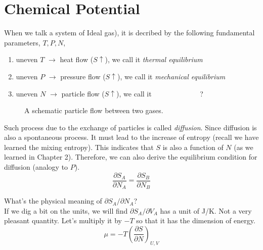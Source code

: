

\section{Chemical Potential}
When we talk a system of Ideal gas), it is decribed by the following fundamental parameters, $T,P,N$,
\begin{enumerate}
\item uneven $T$ $\rightarrow$ heat     flow ($S \uparrow$), we call it {\it thermal equilibrium}
\item uneven $P$ $\rightarrow$ pressure flow ($S \uparrow$), we call it {\it mechanical equilibrium}
\item uneven $N$ $\rightarrow$ particle flow ($S \uparrow$), we call it ~~~~~~~~~~~~~?
\end{enumerate}
\begin{figure}[h]
\centering
{}
\caption{A schematic particle flow between two gases.}
\end{figure}

Such process due to the exchange of particles is called {\it diffusion}. Since diffusion is also a
spontaneous process. It must lead to the increase of entropy (recall we have learned the mixing entropy).
This indicates that $S$ is also a function of $N$ (as we learned in Chapter 2).
Therefore, we can also derive the equilibrium condition for diffusion (analogy to $P$).
\begin{equation} \label{entropy} 
\frac {\partial{S_A}} {\partial{N_A}} =  \frac {\partial{S_B}} {\partial{N_B}} 
\end{equation}

What's the physical meaning of $\partial{S_A}/\partial{N_A}$? \\
If we dig a bit on the units, we will find $\partial{S_A}/\partial{V_A}$ has a unit of J/K. 
Not a very pleasant quantity. Let's multiply it by $-T$ so that it has the dimension of energy.
\begin{equation} \label{entropy} 
\mu = -T (\frac {\partial{S}} {\partial{N}})_{U,V}
\end{equation}

